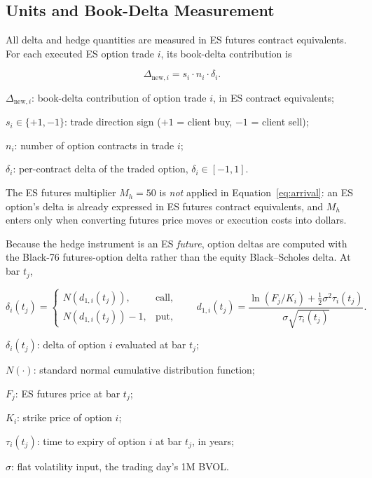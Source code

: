 \documentclass{article}
\begin{document}
\subsection{Units and Book-Delta Measurement}

All delta and hedge quantities are measured in ES futures contract equivalents. For each
executed ES option trade $i$, its book-delta contribution is

\begin{eqbox}
\begin{equation}
\Delta_{\text{new},i} = s_i \cdot n_i \cdot \delta_i.
\label{eq:arrival}
\end{equation}
\end{eqbox}

\begin{vardefs}
\item $\Delta_{\text{new},i}$: book-delta contribution of option trade $i$, in ES
  contract equivalents;
\item $s_i \in \{+1,-1\}$: trade direction sign ($+1$ = client buy, $-1$ = client sell);
\item $n_i$: number of option contracts in trade $i$;
\item $\delta_i$: per-contract delta of the traded option, $\delta_i \in [-1, 1]$.
\end{vardefs}

The ES futures multiplier $M_h = 50$ is \emph{not} applied in
Equation~\eqref{eq:arrival}: an ES option's delta is already expressed in ES futures
contract equivalents, and $M_h$ enters only when converting futures price moves or
execution costs into dollars.

Because the hedge instrument is an ES \emph{future}, option deltas are computed with the
Black-76 futures-option delta rather than the equity Black--Scholes delta. At bar $t_j$,

\begin{eqbox}
\begin{equation}
\delta_i(t_j) =
\begin{cases}
N(d_{1,i}(t_j)), & \text{call},\\[2pt]
N(d_{1,i}(t_j)) - 1, & \text{put},
\end{cases}
\qquad
d_{1,i}(t_j) = \frac{\ln(F_j/K_i) + \tfrac{1}{2}\sigma^2 \tau_i(t_j)}{\sigma\sqrt{\tau_i(t_j)}}.
\label{eq:delta}
\end{equation}
\end{eqbox}

\begin{vardefs}
\item $\delta_i(t_j)$: delta of option $i$ evaluated at bar $t_j$;
\item $N(\cdot)$: standard normal cumulative distribution function;
\item $F_j$: ES futures price at bar $t_j$;
\item $K_i$: strike price of option $i$;
\item $\tau_i(t_j)$: time to expiry of option $i$ at bar $t_j$, in years;
\item $\sigma$: flat volatility input, the trading day's 1M BVOL.
\end{vardefs}
\end{document}
